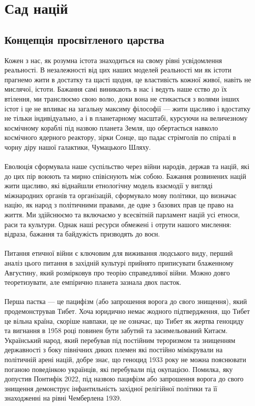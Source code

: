 \section{Сад націй}

\subsection{Концепція просвітленого царства}

Кожен з нас, як розумна істота знаходиться на свому рівні усвідомлення реальності. В незалежності від цих наших моделей реальності ми як істоти прагнемо жити в достатку та щасті щодня, це властивість кожної живої, навіть не мислячої, істоти. Бажання самі виникають в нас і ведуть наше єство до їх втілення, ми транслюємо свою волю, доки вона не стикається з волями інших істот і це не впливає на загальну максиму філософії — жити щасливо і вдостатку не тільки індивідуально, а і в планетарному масштабі, курсуючи на величезному космічному кораблі під назвою планета Земля, що обертається навколо космічного ядерного реактору, зірки Сонце, що падає стрімголів по спіралі в чорну діру нашої галактики, Чумацького Шляху.
\\
\\
Еволюція сформувала наше суспільство через війни народів, держав та націй, які до цих пір воюють та мирно співіснують між собою. Бажання розвинених націй жити щасливо, які віднайшли етнологічну модель взаємодії у вигляді міжнародних органів та організацій, сформувало мову політики, що визначає націю, як народ з політичними правами, де одне з базових прав це право на життя. Ми здійснюємо та включаємо у всесвітній парламент націй усі етноси, раси та культури. Однак наші ресурси обмежені і отрути нашого мислення: відраза, бажання та байдужість призводять до воєн.
\\
\\
Питання етичної війни є ключовим для виживання людського виду, перший аналіз цього питання в західній культурі прийнято приписувати блаженному Августину, який розмірковув про теорію справедливої війни. Можно довго теоретизувати, але емпірично планета зазнала двох пасток.
\\
\\
Перша пастка — це пацифізм (або запрошення ворога до свого знищення), який продемонстрував Тибет. Хоча юридично немає жодного підтвердження, що Тибет це вільна країна, скоріше навпаки, це не означає, що Тибет як жертва геноциду та вигнання в 1958 році повинен бути забутий та засимельований Китаєм. Український народ, який перебував під постійним тероризмом та знищенням державності з боку північних диких племен які постійно мімікрували на політичній арені націй, добре знає, що геноцид 1933 року не можна пояснювати поганою поведінкою українців, які перебували під окупацією. Помилка, яку допустив Понтифік 2022, під назвою пацифізм або запрошення ворога до свого знищення демонструє інфантильність західної релігійної політики та її знаходженні на рівні Чемберлена 1939.
